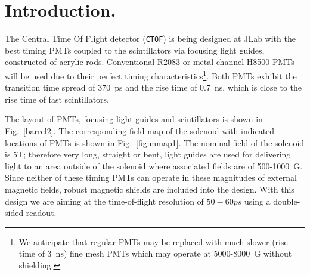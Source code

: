 \documentclass[12pt]{article}
\begin{document}
\section{Introduction.}
The Central Time Of Flight detector ({\tt CTOF}) is being designed at JLab with 
the  best timing PMTs coupled to the scintillators via focusing light guides, constructed of acrylic rods.
Conventional R2083 or metal channel H8500 PMTs will be used due to their perfect timing 
characteristics\footnote{We anticipate that regular PMTs
may be replaced with much slower (rise time of 3~ns) fine mesh PMTs 
which may operate at 5000-8000~G without shielding.}. 
Both PMTs  exhibit the  transition time spread of 370~ps and  the   
rise time of 0.7~ns, which is close to the rise time of fast scintillators.  

The layout of PMTs,  focusing light guides and scintillators  is shown 
in Fig.~{\ref{barrel2}}. The  corresponding field map of the  solenoid with 
indicated  locations of PMTs is shown in  Fig.~\ref{fig:mmap1}.
%
The nominal field of the solenoid  is 5T; therefore 
very long, straight  or bent, light guides are used for  
delivering light to an area outside of the  solenoid where 
associated fields are of 500-1000~G. 
Since neither of these timing PMTs can operate 
in these magnitudes of external magnetic fields, robust magnetic shields are included into the design. 
With this design  we are aiming at the time-of-flight resolution of 
$50-60ps$ using a double-sided readout.
\end{document}

